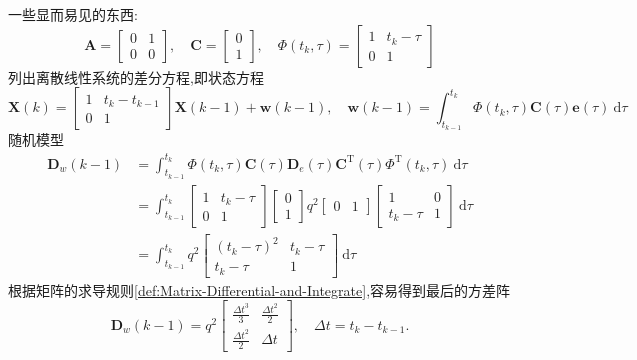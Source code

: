 \documentclass[cn,10pt,citestyle=gb7714-2015,bibstyle=gb7714-2015]{elegantbook}
\newcommand{\md}{\ \mathrm{d}}
\newcommand{\mT}{\mathrm{T}}
\begin{document}
\begin{solution}
  一些显而易见的东西:
  \[
      \bm{A}=\begin{bmatrix}
        0&1\\
        0&0
      \end{bmatrix},\quad\bm{C}=\begin{bmatrix}
        0\\
        1
      \end{bmatrix},\quad\bm{\varPhi}(t_k,\tau)=\begin{bmatrix}
        1&t_k-\tau\\
        0&1
      \end{bmatrix}
  \]
  列出离散线性系统的差分方程,即状态方程
  \[
      \bm{X}(k)=\begin{bmatrix}
        1&t_k-t_{k-1}\\
        0&1
      \end{bmatrix}\bm{X}(k-1)+\bm{w}(k-1),\quad\bm{w}(k-1)=\int_{t_{k-1}}^{t_k}\bm{\varPhi}(t_k,\tau)\bm{C}(\tau)\bm{e}(\tau)\md\tau
  \]
  随机模型
  \begin{align*}
    \bm{D}_w(k-1)&=\int_{t_{k-1}}^{t_k}\bm{\varPhi}(t_k,\tau)\bm{C}(\tau)\bm{D}_e(\tau)\bm{C}^\mT(\tau)\bm{\varPhi}^\mT(t_k,\tau)\md\tau\\
    &=\int_{t_{k-1}}^{t_k}\begin{bmatrix}
      1&t_k-\tau\\
      0&1
    \end{bmatrix}\begin{bmatrix}
      0\\
      1
    \end{bmatrix}
    q^2
    \begin{bmatrix}
      0&1
    \end{bmatrix}
    \begin{bmatrix}
      1&0\\
      t_k-\tau&1
    \end{bmatrix}\md\tau\\
    &=\int_{t_{k-1}}^{t_k}q^2\begin{bmatrix}
      (t_k-\tau)^2&t_k-\tau\\
      t_k-\tau&1
    \end{bmatrix}\md\tau
  \end{align*}
  根据矩阵的求导规则\ref{def:Matrix-Differential-and-Integrate},容易得到最后的方差阵
  \begin{equation}
    \bm{D}_w(k-1)=q^2\begin{bmatrix}
      \frac{\Delta t^3}{3}&\frac{\Delta t^2}{2}\\
      \frac{\Delta t^2}{2}&\Delta t
    \end{bmatrix},\quad\Delta t=t_k-t_{k-1}.
  \end{equation}
\end{solution}
\end{document}
